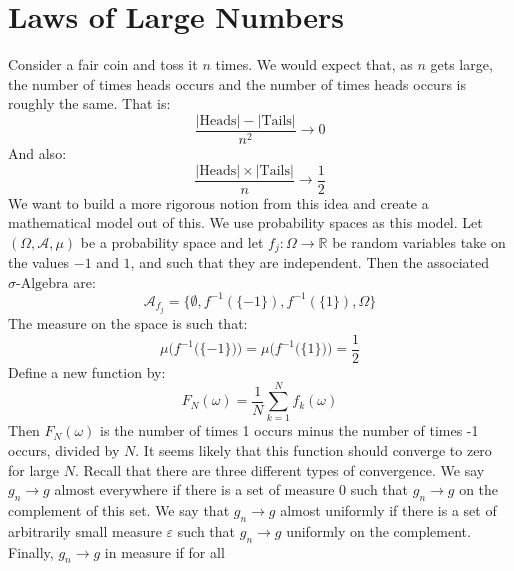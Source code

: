 \section{Laws of Large Numbers}
    Consider a fair coin and toss it $n$ times. We would
    expect that, as $n$ gets large, the number of times
    heads occurs and the number of times heads occurs is
    roughly the same. That is:
    \begin{equation}
        \frac{|\textrm{Heads}|-|\textrm{Tails}|}{n^{2}}
        \rightarrow{0}
    \end{equation}
    And also:
    \begin{equation}
        \frac{|\textrm{Heads}|\times|\textrm{Tails}|}{n}
        \rightarrow\frac{1}{2}
    \end{equation}
    We want to build a more rigorous notion from this idea
    and create a mathematical model out of this. We use
    probability spaces as this model. Let
    $(\Omega,\mathcal{A},\mu)$ be a probability space and
    let $f_{j}:\Omega\rightarrow\mathbb{R}$ be random variables
    take on the values $\minus{1}$ and $1$, and such that
    they are independent. Then the associated
    $\sigma\textrm{-Algebra}$ are:
    \begin{equation}
        \mathcal{A}_{f_{j}}=
        \{\emptyset,f^{\minus{1}}(\{\minus{1}\}),
            f^{\minus{1}}(\{1\}),\Omega\}
    \end{equation}
    The measure on the space is such that:
    \begin{equation}
        \mu\Big(f^{\minus{1}}\big(\{\minus{1}\}\big)\Big)=
        \mu\Big(f^{\minus{1}}\big(\{1\}\big)\Big)=
        \frac{1}{2}
    \end{equation}
    Define a new function by:
    \begin{equation}
        F_{N}(\omega)=\frac{1}{N}\sum_{k=1}^{N}f_{k}(\omega)
    \end{equation}
    Then $F_{N}(\omega)$ is the number of times 1 occurs
    minus the number of times -1 occurs, divided by $N$.
    It seems likely that this function should converge to
    zero for large $N$. Recall that there are three different
    types of convergence. We say
    $g_{n}\rightarrow{g}$ almost everywhere if there is a
    set of measure 0 such that $g_{n}\rightarrow{g}$ on the
    complement of this set. We say that
    $g_{n}\rightarrow{g}$ almost uniformly if there is a set
    of arbitrarily small measure $\varepsilon$ such that
    $g_{n}\rightarrow{g}$ uniformly on the complement.
    Finally, $g_{n}\rightarrow{g}$ in measure if for all
